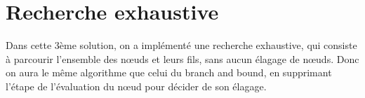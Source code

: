 \documentclass[12pt]{article}
\begin{document}
\section{Recherche exhaustive }
Dans cette 3ème solution, on a implémenté une recherche exhaustive, qui consiste à parcourir l’ensemble des nœuds et leurs fils, sans aucun élagage de nœuds. Donc on aura le même algorithme que celui du branch and bound, en supprimant l’étape de l’évaluation du nœud pour décider de son élagage.  
\end{document}
